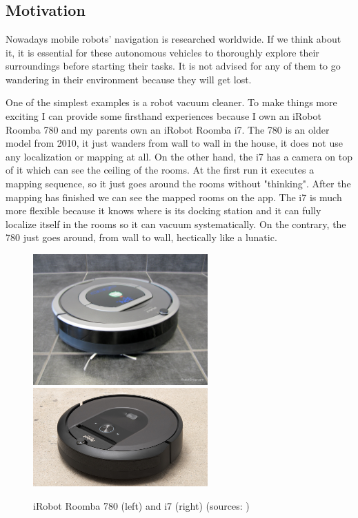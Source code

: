 \chapter{\bevezetes}

\section{Motivation}

Nowadays mobile robots' navigation is researched worldwide. If we think about it, it is essential for these autonomous vehicles to thoroughly explore their surroundings before starting their tasks. It is not advised for any of them to go wandering in their environment because they will get lost.

One of the simplest examples is a robot vacuum cleaner. To make things more exciting I can provide some firsthand experiences because I own an iRobot Roomba 780 and my parents own an iRobot Roomba i7. The 780 is an older model from 2010, it just wanders from wall to wall in the house, it does not use any localization or mapping at all. On the other hand, the i7 has a camera on top of it which can see the ceiling of the rooms. At the first run it executes a mapping sequence, so it just goes around the rooms without "thinking". After the mapping has finished we can see the mapped rooms on the app. The i7 is much more flexible because it knows where is its docking station and it can fully localize itself in the rooms so it can vacuum systematically. On the contrary, the 780 just goes around, from wall to wall, hectically like a lunatic.

\begin{figure}[!ht]
	\centering
	\includegraphics[width=67mm, keepaspectratio]{figures/iRobot_roomba_780.jpg}\hspace{1cm}
	\includegraphics[width=67mm, keepaspectratio]{figures/iRobot_roomba_i7.jpg}\\\vspace{5mm}
	\caption{iRobot Roomba 780 (left) and i7 (right) (sources: \cite{roomba780}\cite{roombai7})}
	\label{fig:Roombas}
\end{figure}

